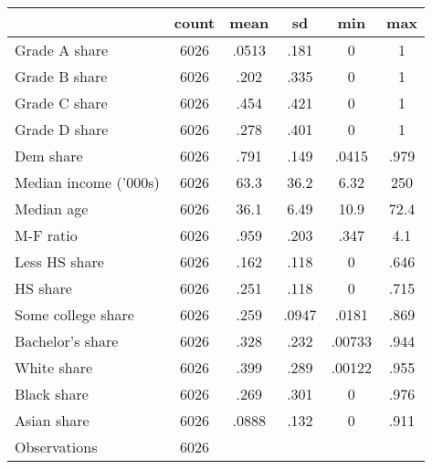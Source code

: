 {
\def\sym#1{\ifmmode^{#1}\else\(^{#1}\)\fi}
\begin{tabular}{l*{1}{ccccc}}
\toprule
                    &       count&        mean&          sd&         min&         max\\
\midrule
Grade A share       &        6026&       .0513&        .181&           0&           1\\
Grade B share       &        6026&        .202&        .335&           0&           1\\
Grade C share       &        6026&        .454&        .421&           0&           1\\
Grade D share       &        6026&        .278&        .401&           0&           1\\
Dem share           &        6026&        .791&        .149&       .0415&        .979\\
Median income ('000s)&        6026&        63.3&        36.2&        6.32&         250\\
Median age          &        6026&        36.1&        6.49&        10.9&        72.4\\
M-F ratio           &        6026&        .959&        .203&        .347&         4.1\\
Less HS share       &        6026&        .162&        .118&           0&        .646\\
HS share            &        6026&        .251&        .118&           0&        .715\\
Some college share  &        6026&        .259&       .0947&       .0181&        .869\\
Bachelor's share    &        6026&        .328&        .232&      .00733&        .944\\
White share         &        6026&        .399&        .289&      .00122&        .955\\
Black share         &        6026&        .269&        .301&           0&        .976\\
Asian share         &        6026&       .0888&        .132&           0&        .911\\
\midrule
Observations        &        6026&            &            &            &            \\
\bottomrule
\end{tabular}
}
